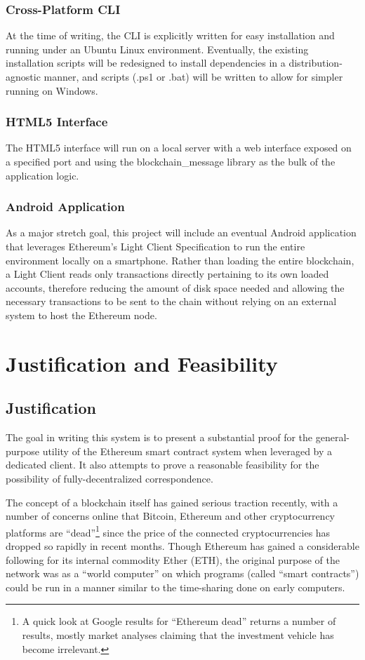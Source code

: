 \documentclass[titlepage]{report}
\begin{document}
\subsection{Cross-Platform CLI}
At the time of writing, the CLI is explicitly written for easy installation and running under an Ubuntu Linux environment. Eventually, the existing installation scripts will be redesigned to install dependencies in a distribution-agnostic manner, and scripts (.ps1 or .bat) will be written to allow for simpler running on Windows.

\subsection{HTML5 Interface}
The HTML5 interface will run on a local server with a web interface exposed on a specified port and using the blockchain\_message library as the bulk of the application logic.

\subsection{Android Application}
As a major stretch goal, this project will include an eventual Android application that leverages Ethereum's Light Client Specification to run the entire environment locally on a smartphone. Rather than loading the entire blockchain, a Light Client reads only transactions directly pertaining to its own loaded accounts, therefore reducing the amount of disk space needed and allowing the necessary transactions to be sent to the chain without relying on an external system to host the Ethereum node.

\chapter{Justification and Feasibility}
\section{Justification}
The goal in writing this system is to present a substantial proof for the general-purpose utility of the Ethereum \gls{smart contract} system when leveraged by a dedicated client. It also attempts to prove a reasonable feasibility for the possibility of fully-decentralized correspondence.

The concept of a \gls{blockchain} itself has gained serious traction recently, with a number of concerns online that Bitcoin, Ethereum and other cryptocurrency platforms are ``dead''\footnote{A quick look at Google results for ``Ethereum dead'' returns a number of results, mostly market analyses claiming that the investment vehicle has become irrelevant.} since the price of the connected cryptocurrencies has dropped so rapidly in recent months. Though Ethereum has gained a considerable following for its internal commodity Ether (ETH), the original purpose of the network was as a ``world computer'' on which programs (called ``smart contracts'') could be run in a manner similar to the time-sharing done on early computers.
\end{document}
